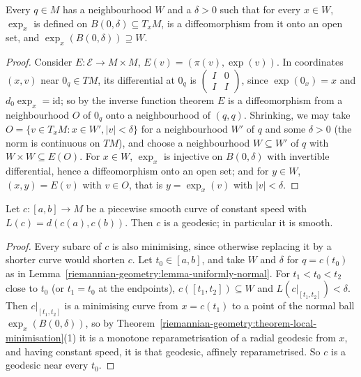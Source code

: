 \begin{lemma}\label{riemannian-geometry:lemma-uniformly-normal}
Every $q \in M$ has a neighbourhood $W$ and a $\delta > 0$ such that for every $x \in W$, $\exp_x$ is defined on $B(0, \delta) \subseteq T_xM$, is a diffeomorphism from it onto an open set, and $\exp_x(B(0, \delta)) \supseteq W$.
\end{lemma}

\begin{proof}
Consider $E \colon \mathcal{E} \to M \times M$, $E(v) = (\pi(v), \exp(v))$. In coordinates $(x, v)$ near $0_q \in TM$, its differential at $0_q$ is $\begin{pmatrix}I & 0\\ I & I\end{pmatrix}$, since $\exp(0_x) = x$ and $d_0\exp_x = \mathrm{id}$; so by the
inverse function theorem $E$ is a diffeomorphism from a neighbourhood $O$ of $0_q$ onto a neighbourhood of $(q, q)$. Shrinking, we may take $O = \{v \in T_xM : x \in W', |v| < \delta\}$ for a neighbourhood $W'$ of $q$ and some $\delta > 0$
(the norm is continuous on $TM$), and choose a neighbourhood $W \subseteq W'$ of $q$ with $W \times W \subseteq E(O)$. For $x \in W$, $\exp_x$ is injective on $B(0, \delta)$ with invertible differential, hence a diffeomorphism onto an open
set; and for $y \in W$, $(x, y) = E(v)$ with $v \in O$, that is $y = \exp_x(v)$ with $|v| < \delta$.
\end{proof}

\begin{lemma}\label{riemannian-geometry:lemma-minimising-geodesic}
Let $c \colon [a, b] \to M$ be a piecewise smooth curve of constant speed with $L(c) = d(c(a), c(b))$. Then $c$ is a geodesic; in particular it is smooth.
\end{lemma}

\begin{proof}
Every subarc of $c$ is also minimising, since otherwise replacing it by a shorter curve would shorten $c$. Let $t_0 \in [a, b]$, and take $W$ and $\delta$ for $q = c(t_0)$ as in Lemma~\ref{riemannian-geometry:lemma-uniformly-normal}. For
$t_1 < t_0 < t_2$ close to $t_0$ (or $t_1 = t_0$ at the endpoints), $c([t_1, t_2]) \subseteq W$ and $L(c|_{[t_1, t_2]}) < \delta$. Then $c|_{[t_1, t_2]}$ is a minimising curve from $x = c(t_1)$ to a point of the normal ball $\exp_x(B(0, \delta))$, so by
Theorem~\ref{riemannian-geometry:theorem-local-minimisation}(1) it is a monotone reparametrisation of a radial geodesic from $x$, and having constant speed, it is that geodesic, affinely reparametrised. So $c$ is a geodesic near every $t_0$.
\end{proof}

